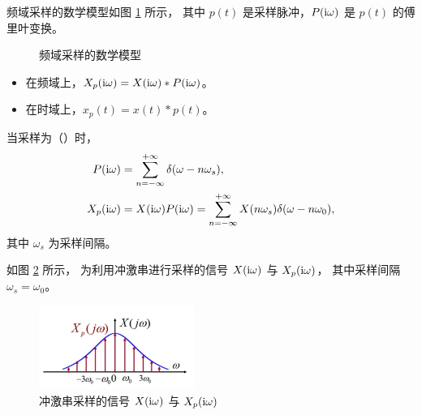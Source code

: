 \begin{definition}[频域采样]
    频域采样的数学模型如图 \ref{fig:sampling-freq-math-model} 所示，
    其中 $p(t)$ 是采样脉冲，$P(\mathrm{i} \omega)$ 是 $p(t)$ 的傅里叶变换。
    \begin{figure}[H]
        \centering
        \caption{频域采样的数学模型}
        \label{fig:sampling-freq-math-model}
    \end{figure}

    \begin{itemize}
        \item 在频域上，$X_p(\mathrm{i} \omega) = X(\mathrm{i} \omega) * P(\mathrm{i} \omega)$。
        \item 在时域上，$x_p(t) = x(t) * p(t)$。
    \end{itemize}
    当采样为（）时，
    \begin{align*}
        P(\mathrm{i}\omega) & = \sum_{n = -\infty}^{+\infty}\delta(\omega - n\omega_s), \\
        X_p(\mathrm{i}\omega) & = X(\mathrm{i}\omega)P(\mathrm{i}\omega) = \sum_{n = -\infty}^{+\infty}X(n\omega_s)\delta(\omega - n\omega_0),
    \end{align*}
    其中 $\omega_s$ 为采样间隔。
\end{definition}

\begin{example}
    如图 \ref{fig:impulse-sampling-freq} 所示，
    为利用冲激串进行采样的信号 $X(\mathrm{i}\omega)$ 与 $X_p(\mathrm{i}\omega)$，
    其中采样间隔 $\omega_s = \omega_0$。
    \begin{figure}[H]
        \centering
        \includegraphics[width=0.45\textwidth]{chap2/img/impulse-sampling-freq.png}
        \caption{冲激串采样的信号 $X(\mathrm{i}\omega)$ 与 $X_p(\mathrm{i}\omega)$}
        \label{fig:impulse-sampling-freq}
    \end{figure}
\end{example}

